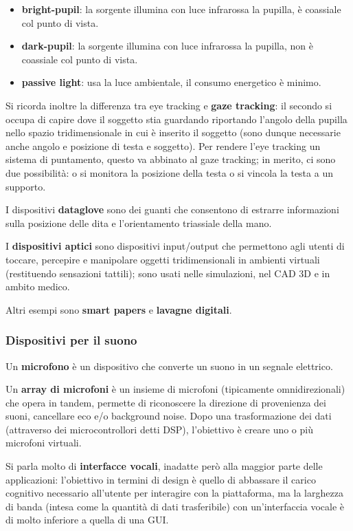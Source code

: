\begin{itemize}
	\itemsep-0.3em
	\item \textbf{bright-pupil}: la sorgente illumina con luce infrarossa la pupilla, è coassiale col punto di vista.
	\item \textbf{dark-pupil}: la sorgente illumina con luce infrarossa la pupilla, non è coassiale col punto di vista.
	\item \textbf{passive light}: usa la luce ambientale, il consumo energetico è minimo.
\end{itemize}

Si ricorda inoltre la differenza tra eye tracking e \textbf{gaze tracking}: il secondo si occupa di capire dove il soggetto stia guardando
riportando l'angolo della pupilla nello spazio tridimensionale in cui è inserito il soggetto (sono dunque necessarie anche angolo e posizione
di testa e soggetto). Per rendere l'eye tracking un sistema di puntamento, questo va abbinato al gaze tracking; in merito, ci sono due
possibilità: o si monitora la posizione della testa o si vincola la testa a un supporto.

I dispositivi \textbf{dataglove} sono dei guanti che consentono di estrarre informazioni sulla posizione delle dita e l'orientamento triassiale
della mano.

I \textbf{dispositivi aptici} sono dispositivi input/output che permettono agli utenti di toccare, percepire e manipolare oggetti tridimensionali
in ambienti virtuali (restituendo sensazioni tattili); sono usati nelle simulazioni, nel CAD 3D e in ambito medico.

Altri esempi sono \textbf{smart papers} e \textbf{lavagne digitali}.

\subsubsection*{Dispositivi per il suono}
Un \textbf{microfono} è un dispositivo che converte un suono in un segnale elettrico.

Un \textbf{array di microfoni} è un insieme di microfoni (tipicamente omnidirezionali) che opera in tandem, permette di riconoscere la direzione
di provenienza dei suoni, cancellare eco e/o background noise. Dopo una trasformazione dei dati (attraverso dei microcontrollori detti DSP), l'obiettivo
è creare uno o più microfoni virtuali.

Si parla molto di \textbf{interfacce vocali}, inadatte però alla maggior parte delle applicazioni: l'obiettivo in termini di design è quello di abbassare
il carico cognitivo necessario all'utente per interagire con la piattaforma, ma la larghezza di banda (intesa come la quantità di dati trasferibile) con
un'interfaccia vocale è di molto inferiore a quella di una GUI.

